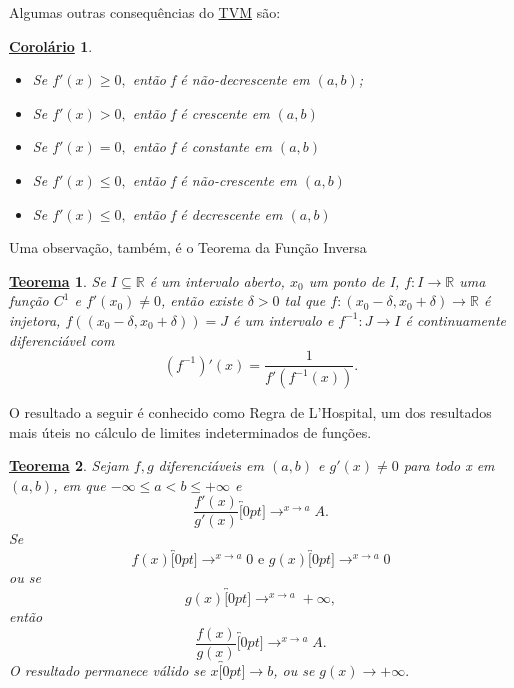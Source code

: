 \documentclass{article}
\newtheorem*{theorem*}{\underline{Teorema}}
\newtheorem*{crl*}{\underline{Corol\'ario}}
\begin{document}
  Algumas outras consequências do \hyperlink{mean_value}{TVM} são:
 \begin{crl*}
  \begin{itemize}
    \item[a)] Se \(f'(x)\geq  0,\) então f é não-decrescente em \((a, b)\);
      \item[b)] Se \(f'(x) > 0,\) então f é crescente em \((a, b)\)
        \item[c)]  Se \(f'(x) = 0,\) então f é constante em \((a, b)\)
          \item[d)] Se \(f'(x)\leq  0,\) então f é não-crescente em \((a, b)\)
            \item[e)] Se \(f'(x)\leq  0,\) então f é decrescente em \((a, b)\)
  \end{itemize}
 \end{crl*}
 Uma observa\c cão, também, é o Teorema da Fun\c cão Inversa
\begin{theorem*}
  Se \(I\subseteq{\mathbb{R}}\) é um intervalo aberto, \(x_{0}\) um ponto de I,
  \(f:I\rightarrow \mathbb{R}\) uma fun\c cão \(C^{1}\) e \(f'(x_{0})\neq 0\), então
  existe \(\delta >0\) tal que \(f:(x_{0}-\delta, x_{0}+\delta )\rightarrow \mathbb{R}\) 
  é injetora, \(f((x_{0}-\delta ,x_{0}+\delta )) = J\) é um intervalo e \(f^{-1}:J\rightarrow I\)
  é continuamente diferenciável com 
    \[
      (f^{-1})'(x) = \frac{1}{f'(f^{-1}(x))}.
    \]
\end{theorem*}
  O resultado a seguir é conhecido como Regra de L'Hospital, um dos resultados
  mais úteis no cálculo de limites indeterminados de fun\c cões.
\hypertarget{Lhospital}{ 
  \begin{theorem*}
   Sejam \(f, g\) diferenciáveis em \((a, b)\) e \(g'(x)\neq0\) para todo
   x em \((a, b)\), em que \(-\infty\leq a < b\leq +\infty\) e 
     \[
       \frac{f'(x)}{g'(x)}\overbracket[0pt]{\longrightarrow}^{x\to a}A.
     \]
  Se 
    \[
      f(x)\overbracket[0pt]{\longrightarrow}^{x\to a}0\text{ e }g(x)\overbracket[0pt]{\longrightarrow}^{x\to a}0
    \]
  ou se 
    \[
      g(x)\overbracket[0pt]{\longrightarrow}^{x\to a}+\infty,
    \]
  então 
    \[
      \frac{f(x)}{g(x)}\overbracket[0pt]{\longrightarrow}^{x\to a}A.
    \]
  O resultado permanece válido se \(x\overbracket[0pt]{\longrightarrow}b\), ou se
  \(g(x)\longrightarrow+\infty.\)
 \end{theorem*}
}
\end{document}
